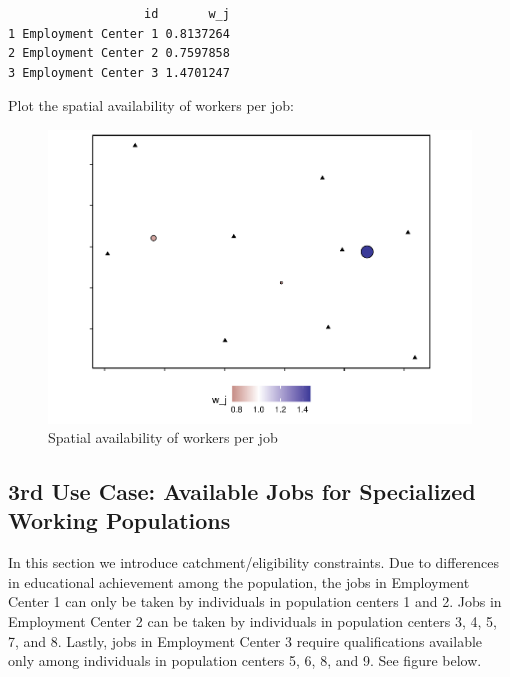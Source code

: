 \documentclass[]{elsarticle} %
\begin{document}
\begin{verbatim}
                   id       w_j
1 Employment Center 1 0.8137264
2 Employment Center 2 0.7597858
3 Employment Center 3 1.4701247
\end{verbatim}

Plot the spatial availability of workers per job:

\begin{figure}
\includegraphics[width=1\linewidth]{Spatial-Availability_files/figure-latex/toy-example-availability-workers-per-job-1} \caption{\label{fig:toy-example-availability-workers-per-job}Spatial availability of workers per job}\label{fig:toy-example-availability-workers-per-job}
\end{figure}

\hypertarget{rd-use-case-available-jobs-for-specialized-working-populations}{%
\subsection{3rd Use Case: Available Jobs for Specialized Working
Populations}\label{rd-use-case-available-jobs-for-specialized-working-populations}}

In this section we introduce catchment/eligibility constraints. Due to
differences in educational achievement among the population, the jobs in
Employment Center 1 can only be taken by individuals in population
centers 1 and 2. Jobs in Employment Center 2 can be taken by individuals
in population centers 3, 4, 5, 7, and 8. Lastly, jobs in Employment
Center 3 require qualifications available only among individuals in
population centers 5, 6, 8, and 9. See figure below.
\end{document}

